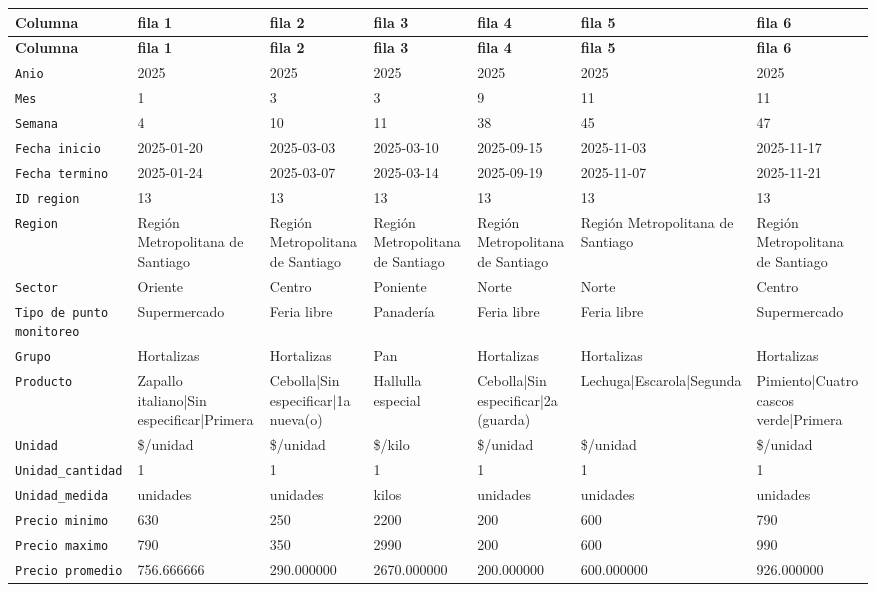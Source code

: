 \documentclass[10pt]{article}
\newcommand{\hdr}[1]{\textbf{\color{white}#1}}
\begin{document}
\footnotesize
\begin{xltabular}{\linewidth}{@{}p{4.3cm} Y Y Y Y Y Y @{}}
\hdr{Columna} & \hdr{fila 1} & \hdr{fila 2} & \hdr{fila 3} & \hdr{fila 4} & \hdr{fila 5} & \hdr{fila 6} \\
\endfirsthead
{}\hdr{Columna} & \hdr{fila 1} & \hdr{fila 2} & \hdr{fila 3} & \hdr{fila 4} & \hdr{fila 5} & \hdr{fila 6} \\
\endhead
{}\texttt{Anio} & 2025 & 2025 & 2025 & 2025 & 2025 & 2025 \\
\texttt{Mes} & 1 & 3 & 3 & 9 & 11 & 11 \\
\texttt{Semana} & 4 & 10 & 11 & 38 & 45 & 47 \\
\texttt{Fecha inicio} & 2025-{}01-{}20 & 2025-{}03-{}03 & 2025-{}03-{}10 & 2025-{}09-{}15 & 2025-{}11-{}03 & 2025-{}11-{}17 \\
\texttt{Fecha termino} & 2025-{}01-{}24 & 2025-{}03-{}07 & 2025-{}03-{}14 & 2025-{}09-{}19 & 2025-{}11-{}07 & 2025-{}11-{}21 \\
\texttt{ID region} & 13 & 13 & 13 & 13 & 13 & 13 \\
\texttt{Region} & Región Metropolitana de Santiago & Región Metropolitana de Santiago & Región Metropolitana de Santiago & Región Metropolitana de Santiago & Región Metropolitana de Santiago & Región Metropolitana de Santiago \\
\texttt{Sector} & Oriente & Centro & Poniente & Norte & Norte & Centro \\
\texttt{Tipo de punto monitoreo} & Supermercado & Feria libre & Panadería & Feria libre & Feria libre & Supermercado \\
\texttt{Grupo} & Hortalizas & Hortalizas & Pan & Hortalizas & Hortalizas & Hortalizas \\
\texttt{Producto} & Zapallo italiano|Sin especific\allowbreak{}ar|Primer\allowbreak{}a & Cebolla|Sin especificar|1a nueva(o) & Hallulla especial & Cebolla|Sin especificar|2a (guarda) & Lechuga|E\allowbreak{}scarola|S\allowbreak{}egunda & Pimiento|\allowbreak{}Cuatro cascos verde|Primera \\
\texttt{Unidad} & \$/unidad & \$/unidad & \$/kilo & \$/unidad & \$/unidad & \$/unidad \\
\texttt{Unidad\_\allowbreak{}cantidad} & 1 & 1 & 1 & 1 & 1 & 1 \\
\texttt{Unidad\_\allowbreak{}medida} & unidades & unidades & kilos & unidades & unidades & unidades \\
\texttt{Precio minimo} & 630 & 250 & 2200 & 200 & 600 & 790 \\
\texttt{Precio maximo} & 790 & 350 & 2990 & 200 & 600 & 990 \\
\texttt{Precio promedio} & 756.666666 & 290.000000 & 2670.000000 & 200.000000 & 600.000000 & 926.000000 \\
\end{xltabular}
\normalsize
\end{document}
